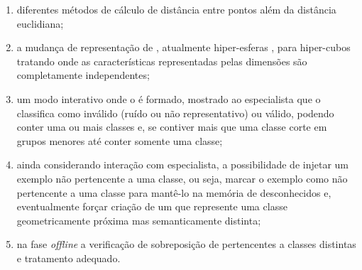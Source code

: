 \begin{enumerate}[label={\alph*)}]
  
  \item diferentes métodos de cálculo de distância entre pontos além da
  distância euclidiana;
  
  \item a mudança de representação de \clusters, atualmente hiper-esferas
  \cite{Costa2019thesis}, para hiper-cubos tratando \datasets onde as
  características representadas pelas dimensões são completamente
  independentes;
  
  \item um modo interativo onde o \cluster é formado, mostrado ao especialista
  que o classifica como inválido (ruído ou não representativo) ou válido,
  podendo conter uma ou mais classes e, se contiver mais que uma classe corte em
  grupos menores até conter somente uma classe;
  
  \item ainda considerando interação com especialista, a possibilidade de
  injetar um exemplo não pertencente a uma classe, ou seja, marcar o exemplo
  como não pertencente a uma classe para mantê-lo na memória de
  desconhecidos e, eventualmente forçar criação de um \cluster que represente
  uma classe geometricamente próxima mas semanticamente distinta;
  
  \item na fase \emph{offline} a verificação de sobreposição de \clusters
  pertencentes a classes distintas e tratamento adequado.

\end{enumerate}
